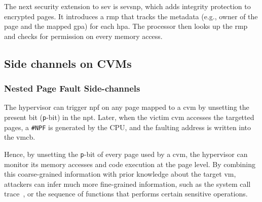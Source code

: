The next security extension to \gls{sev} is \gls{sevsnp}, which adds integrity protection to encrypted pages.
It introduces a \gls{rmp} that tracks the metadata (e.g., owner of the page and the mapped \gls{gpa}) for each \gls{hpa}.
The processor then looks up the \gls{rmp} and checks for permission on every memory access.


\subsection{Side channels on CVMs}

\subsubsection{Nested Page Fault Side-channels}
% 

The hypervisor can trigger \gls{npf} on any page mapped to a \gls{cvm} by unsetting the present bit (\texttt{p}-bit) in the \gls{npt}.
Later, when the victim \gls{cvm} accesses the targetted pages, a \texttt{\#NPF} is generated by the CPU, and the faulting address is written into the \gls{vmcb}.

Hence, by unsetting the \texttt{p}-bit of every page used by a \gls{cvm}, the hypervisor can monitor its memory accesses and code execution at the page level. By combining this coarse-grained information with prior knowledge about the target \gls{vm}, attackers can infer much more fine-grained information, such as the system call trace~\cite{hetzelt_security_2017}, or the sequence of functions that performs certain sensitive operations.






